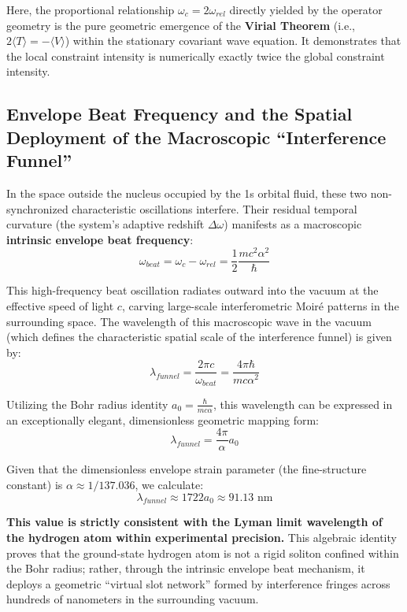 \documentclass[12pt, a4paper]{article}
\begin{document}
Here, the proportional relationship $\omega_c = 2\omega_{rel}$ directly yielded by the operator geometry is the pure geometric emergence of the \textbf{Virial Theorem} (i.e., $2\langle T \rangle = -\langle V \rangle$) within the stationary covariant wave equation. It demonstrates that the local constraint intensity is numerically exactly twice the global constraint intensity.

\subsection{Envelope Beat Frequency and the Spatial Deployment of the Macroscopic ``Interference Funnel''}

In the space outside the nucleus occupied by the 1s orbital fluid, these two non-synchronized characteristic oscillations interfere. Their residual temporal curvature (the system's adaptive redshift $\Delta\omega$) manifests as a macroscopic \textbf{intrinsic envelope beat frequency}:
\begin{equation}
    \omega_{beat} = \omega_c - \omega_{rel} = \frac{1}{2} \frac{mc^2\alpha^2}{\hbar} 
\end{equation}

This high-frequency beat oscillation radiates outward into the vacuum at the effective speed of light $c$, carving large-scale interferometric Moiré patterns in the surrounding space. The wavelength of this macroscopic wave in the vacuum (which defines the characteristic spatial scale of the interference funnel) is given by:
\begin{equation}
    \lambda_{funnel} = \frac{2\pi c}{\omega_{beat}} = \frac{4\pi \hbar}{mc\alpha^2} 
\end{equation}

Utilizing the Bohr radius identity $a_0 = \frac{\hbar}{mc\alpha}$, this wavelength can be expressed in an exceptionally elegant, dimensionless geometric mapping form:
\begin{equation}
    \lambda_{funnel} = \frac{4\pi}{\alpha} a_0 
\end{equation}

Given that the dimensionless envelope strain parameter (the fine-structure constant) is $\alpha \approx 1/137.036$, we calculate:
\begin{equation}
    \lambda_{funnel} \approx 1722 a_0 \approx 91.13\text{ nm} 
\end{equation}

\textbf{This value is strictly consistent with the Lyman limit wavelength of the hydrogen atom within experimental precision.} This algebraic identity proves that the ground-state hydrogen atom is not a rigid soliton confined within the Bohr radius; rather, through the intrinsic envelope beat mechanism, it deploys a geometric ``virtual slot network'' formed by interference fringes across hundreds of nanometers in the surrounding vacuum.
\end{document}

